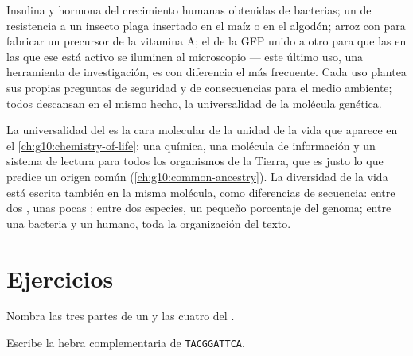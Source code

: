 \begin{example}\label{ex:g10:universal-dna:uses}
Insulina y hormona del crecimiento humanas obtenidas de bacterias; un
 de resistencia a un insecto plaga insertado en el maíz o en el
algodón; arroz con  para fabricar un precursor de la vitamina A;
el  de la GFP unido a otro  para que las  en las que ese
 está activo se iluminen al microscopio --- este último uso, una
herramienta de investigación, es con diferencia el más frecuente. Cada
uso plantea sus propias preguntas de seguridad y de consecuencias para
el medio ambiente; todos descansan en el mismo hecho, la universalidad
de la molécula genética.
\end{example}

\begin{remark}\label{rem:g10:universal-dna:unity}
La universalidad del  es la cara molecular de la unidad de la vida
que aparece en el \cref{ch:g10:chemistry-of-life}: una química, una
molécula de información y un sistema de lectura para todos los
organismos de la Tierra, que es justo lo que predice un origen común
(\cref{ch:g10:common-ancestry}). La diversidad de la vida está escrita
también en la misma molécula, como diferencias de secuencia: entre dos
, unas pocas ; entre dos especies, un pequeño porcentaje del
genoma; entre una bacteria y un humano, toda la organización del texto.
\end{remark}

\section{Ejercicios}

\begin{exercise}[$\star$]\label{exo:g10:universal-dna:1}
Nombra las tres partes de un  y las cuatro  del .
\end{exercise}

\begin{exercise}[$\star$]\label{exo:g10:universal-dna:2}
Escribe la hebra complementaria de \texttt{TACGGATTCA}.
\end{exercise}


